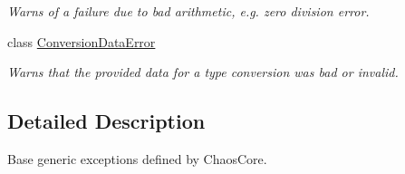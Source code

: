 \begin{DoxyCompactItemize}
\begin{DoxyCompactList}\small\item\em Warns of a failure due to bad arithmetic, e.\-g. zero division error. \end{DoxyCompactList}\item 
class \hyperlink{classchaos_1_1ex_1_1_conversion_data_error}{Conversion\-Data\-Error}
\begin{DoxyCompactList}\small\item\em Warns that the provided data for a type conversion was bad or invalid. \end{DoxyCompactList}\end{DoxyCompactItemize}


\subsection{Detailed Description}
Base generic exceptions defined by Chaos\-Core. 